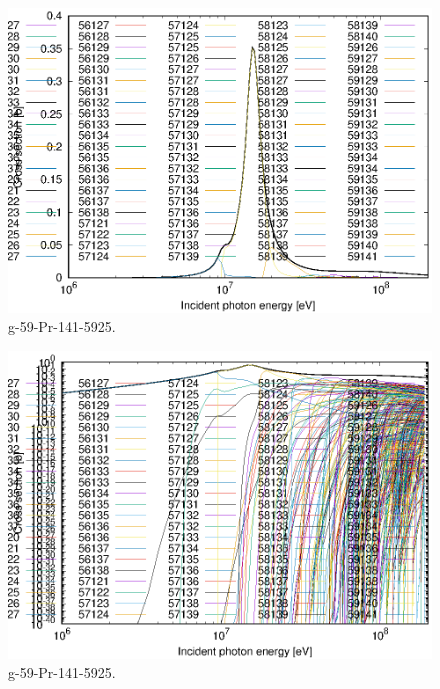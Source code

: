 \begin{figure}
 \includegraphics[width=\linewidth]{eps/g_59-Pr-141_5925.eps}
  \caption{g-59-Pr-141-5925.}
\end{figure}
\begin{figure}
 \includegraphics[width=\linewidth]{eps-log/g_59-Pr-141_5925.eps}
 \caption{g-59-Pr-141-5925.}
\end{figure}
\newpage \clearpage

